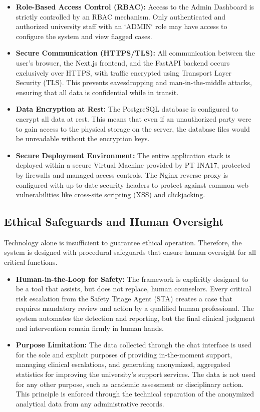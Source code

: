 \begin{itemize}
    \item \textbf{Role-Based Access Control (RBAC):} Access to the Admin Dashboard is strictly controlled by an RBAC mechanism. Only authenticated and authorized university staff with an `ADMIN` role may have access to configure the system and view flagged cases.
    \item \textbf{Secure Communication (HTTPS/TLS):} All communication between the user's browser, the Next.js frontend, and the FastAPI backend occurs exclusively over HTTPS, with traffic encrypted using Transport Layer Security (TLS). This prevents eavesdropping and man-in-the-middle attacks, ensuring that all data is confidential while in transit.
    \item \textbf{Data Encryption at Rest:} The PostgreSQL database is configured to encrypt all data at rest. This means that even if an unauthorized party were to gain access to the physical storage on the server, the database files would be unreadable without the encryption keys.
    \item \textbf{Secure Deployment Environment:} The entire application stack is deployed within a secure Virtual Machine provided by PT INA17, protected by firewalls and managed access controls. The Nginx reverse proxy is configured with up-to-date security headers to protect against common web vulnerabilities like cross-site scripting (XSS) and clickjacking.
\end{itemize}

\subsection{Ethical Safeguards and Human Oversight}

Technology alone is insufficient to guarantee ethical operation. Therefore, the system is designed with procedural safeguards that ensure human oversight for all critical functions.

\begin{itemize}
    \item \textbf{Human-in-the-Loop for Safety:} The framework is explicitly designed to be a tool that assists, but does not replace, human counselors. Every critical risk escalation from the Safety Triage Agent (STA) creates a case that requires mandatory review and action by a qualified human professional. The system automates the detection and reporting, but the final clinical judgment and intervention remain firmly in human hands.
    \item \textbf{Purpose Limitation:} The data collected through the chat interface is used for the sole and explicit purposes of providing in-the-moment support, managing clinical escalations, and generating anonymized, aggregated statistics for improving the university's support services. The data is not used for any other purpose, such as academic assessment or disciplinary action. This principle is enforced through the technical separation of the anonymized analytical data from any administrative records.
\end{itemize}

